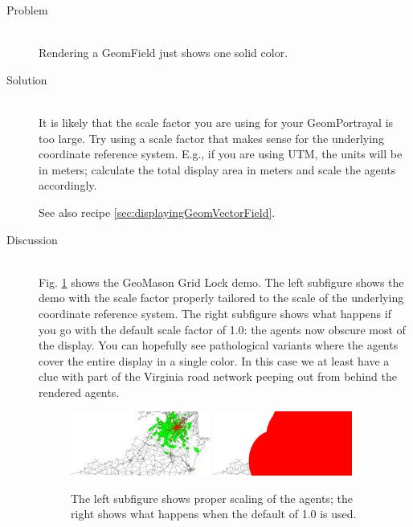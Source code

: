 \documentclass[twoside,10pt]{book}
\newcommand\class[1]{\index{Classes!{#1}}\textsf{#1}}
\newcommand\code[1]{\textsf{#1}}
\begin{document}
\begin{description}
\item[Problem]~\\
Rendering a \code{GeomField} just shows one solid color.

\item[Solution]~\\
It is likely that the scale factor you are using for your
\class{GeomPortrayal} is too large.  Try using a scale factor that
makes sense for the underlying coordinate reference system.  E.g., if
you are using UTM, the units will be in meters; calculate the total
display area in meters and scale the agents accordingly.

See also recipe \ref{sec:displayingGeomVectorField}.

\item[Discussion]~\\
Fig. \ref{fig:properscalefactor} shows the GeoMason Grid Lock demo. The left
subfigure shows the demo with the scale factor properly tailored to
the scale of the underlying coordinate reference system.  The right
subfigure shows what happens if you go with the default scale factor
of 1.0: the agents now obscure most of the display.  You can hopefully
see pathological variants where the agents cover the entire display in
a single color.  In this case we at least have a clue with part of the
Virginia road network peeping out from behind the rendered agents.
\begin{figure}[ht]
  \centering
  \includegraphics[width=0.45\textwidth]{gridlocknormal.pdf}
  \includegraphics[width=0.45\textwidth]{gridlockbroken.pdf}
  \caption{The left subfigure shows proper scaling of the agents; the
    right shows what happens when the default of 1.0 is used.}
  \label{fig:properscalefactor}
\end{figure}

\end{description}
\end{document}
